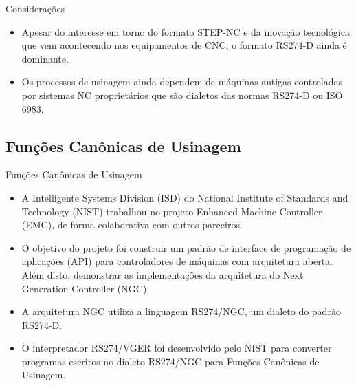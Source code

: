 \documentclass[aspectratio=169]{beamer}
\begin{document}
{\begin{frame}{Considerações}

  \begin{itemize}
    \item {
      Apesar do interesse em torno do formato STEP-NC e da inovação tecnológica
      que vem acontecendo nos equipamentos de CNC, o formato RS274-D ainda é dominante.
    }
    \item {
      Os processos de usinagem ainda dependem de máquinas antigas controladas
      por sistemas NC proprietários que são dialetos das normas RS274-D ou ISO 6983.
    }
  \end{itemize}   

\end{frame}


\subsection{Funções Canônicas de Usinagem}

\begin{frame}{Funções Canônicas de Usinagem}
  \begin{itemize}
    \item{
      A Intelligente Systems Division (ISD) do National Institute of Standards and Technology (NIST) 
      trabalhou no projeto Enhanced Machine Controller (EMC), de forma colaborativa com outros parceiros.
    }
    \item {
      O objetivo do projeto foi construir um padrão de interface de programação de aplicações 
      (API) para controladores de máquinas com arquitetura aberta. 
      Além disto, demonstrar as implementações da arquitetura do Next Generation Controller (NGC).
    }
    \item {
      A arquitetura NGC utiliza a linguagem RS274/NGC, um dialeto do padrão RS274-D.
    }
    \item {
      O interpretador RS274/VGER foi desenvolvido pelo NIST para converter programas escritos no dialeto 
      RS274/NGC para Funções Canônicas de Usinagem.
    }
  \end{itemize}
\end{frame}


}
\end{document}
